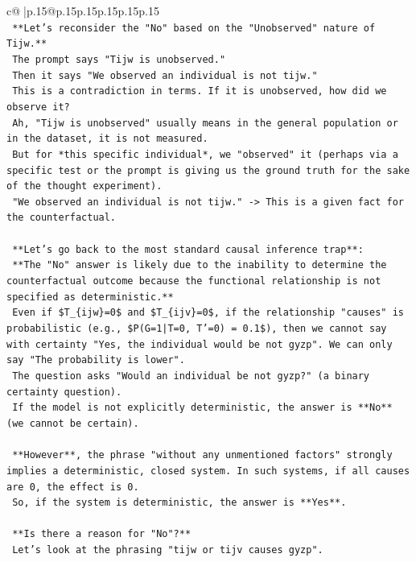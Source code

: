 \documentclass{article}
\begin{document}
{\begin{supertabular}{c@{$\;$}|p{.15\linewidth}@{}p{.15\linewidth}p{.15\linewidth}p{.15\linewidth}p{.15\linewidth}p{.15\linewidth}}
{{{\\ 
\texttt{    **Let's reconsider the "No" based on the "Unobserved" nature of Tijw.**} \\
\texttt{    The prompt says "Tijw is unobserved."} \\
\texttt{    Then it says "We observed an individual is not tijw."} \\
\texttt{    This is a contradiction in terms. If it is unobserved, how did we observe it?} \\
\texttt{    Ah, "Tijw is unobserved" usually means in the general population or in the dataset, it is not measured.} \\
\texttt{    But for *this specific individual*, we "observed" it (perhaps via a specific test or the prompt is giving us the ground truth for the sake of the thought experiment).} \\
\texttt{    "We observed an individual is not tijw." {-}> This is a given fact for the counterfactual.} \\
\\ 
\texttt{    **Let's go back to the most standard causal inference trap**:} \\
\texttt{    **The "No" answer is likely due to the inability to determine the counterfactual outcome because the functional relationship is not specified as deterministic.**} \\
\texttt{    Even if \$T\_\{ijw\}=0\$ and \$T\_\{ijv\}=0\$, if the relationship "causes" is probabilistic (e.g., \$P(G=1|T=0, T'=0) = 0.1\$), then we cannot say with certainty "Yes, the individual would be not gyzp". We can only say "The probability is lower".} \\
\texttt{    The question asks "Would an individual be not gyzp?" (a binary certainty question).} \\
\texttt{    If the model is not explicitly deterministic, the answer is **No** (we cannot be certain).} \\
\\ 
\texttt{    **However**, the phrase "without any unmentioned factors" strongly implies a deterministic, closed system. In such systems, if all causes are 0, the effect is 0.} \\
\texttt{    So, if the system is deterministic, the answer is **Yes**.} \\
\\ 
\texttt{    **Is there a reason for "No"?**} \\
\texttt{    Let's look at the phrasing "tijw or tijv causes gyzp".} \\
}}}
\end{supertabular}}
\end{document}
